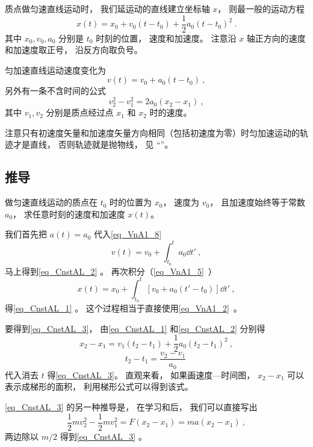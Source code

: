 

质点做匀速直线运动时， 我们延运动的直线建立坐标轴 $x$， 则最一般的运动方程
\begin{equation}\label{eq_CnstAL_1}
x(t) = x_0 + v_0 (t - t_0) +  \frac12 a_0 (t - t_0)^2~.
\end{equation}
其中 $x_0, v_0, a_0$ 分别是 $t_0$ 时刻的位置， 速度和加速度。 注意沿 $x$ 轴正方向的速度和加速度取正号， 沿反方向取负号。

匀加速直线运动速度变化为
\begin{equation}\label{eq_CnstAL_2}
v(t) = v_0 + a_0 (t - t_0)~,
\end{equation}
另外有一条不含时间的公式
\begin{equation}\label{eq_CnstAL_3}
v_2^2 - v_1^2 = 2a_0 (x_2 - x_1)~,
\end{equation}
其中 $v_1, v_2$ 分别是质点经过点 $x_1$ 和 $x_2$ 时的速度。

注意只有初速度矢量和加速度矢量方向相同（包括初速度为零）时匀加速运动的轨迹才是直线， 否则轨迹就是抛物线， 见 “”。

\subsection{推导}
做匀速直线运动的质点在 $t_0$ 时的位置为 $x_0$， 速度为 $v_0$， 且加速度始终等于常数 $a_0$， 求任意时刻的速度和加速度 $x(t)$。

我们首先把 $a(t) = a_0$ 代入\autoref{eq_VnA1_8}~
\begin{equation}
v(t) = v_0 + \int_{t_0}^t a_0 \dd{t'}~,
\end{equation}
马上得到\autoref{eq_CnstAL_2} 。 再次积分（\autoref{eq_VnA1_5}~）
\begin{equation}
x(t) = x_0 + \int_{t_0}^t [v_0 + a_0 (t' - t_0)] \dd{t'}~,
\end{equation}
得\autoref{eq_CnstAL_1} 。 这个过程相当于直接使用\autoref{eq_VnA1_2}~。

要得到\autoref{eq_CnstAL_3}， 由\autoref{eq_CnstAL_1} 和\autoref{eq_CnstAL_2} 分别得
\begin{equation}
x_2 - x_1 = v_1 (t_2 - t_1) +  \frac12 a_0 (t_2 - t_1)^2~,
\end{equation}
\begin{equation}
t_2 - t_1 = \frac{v_2 - v_1}{a_0}~
\end{equation}
代入消去 $t$ 得\autoref{eq_CnstAL_3}。 直观来看， 如果画速度—时间图， $x_2 - x_1$ 可以表示成梯形的面积， 利用梯形公式可以得到该式。

\autoref{eq_CnstAL_3} 的另一种推导是， 在学习和后， 我们可以直接写出
\begin{equation}
\frac{1}{2}mv_2^2 - \frac{1}{2}mv_1^2 = F (x_2 - x_1) = ma (x_2 - x_1)~,
\end{equation}
两边除以 $m/2$ 得到\autoref{eq_CnstAL_3} 。
